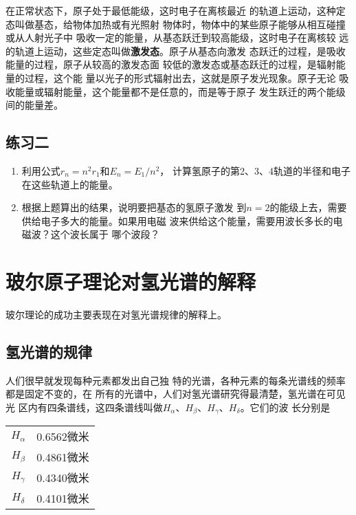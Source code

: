 在正常状态下，原子处于最低能级，这时电子在离核最近
的轨道上运动，这种定态叫做基态，给物体加热或有光照射
物体时，物体中的某些原子能够从相互碰撞或从人射光子中
吸收一定的能量，从基态跃迁到较高能级，这时电子在离核较
远的轨道上运动，这些定态叫做\textbf{激发态}。原子从基态向激发
态跃迁的过程，是吸收能量的过程，原子从较高的激发态面
较低的激发态或基态跃迁的过程，是辐射能量的过程，这个能
量以光子的形式辐射出去，这就是原子发光现象。原子无论
吸收能量或辐射能量，这个能量都不是任意的，而是等于原子
发生跃迁的两个能级间的能量差。


\subsection*{练习二}

\begin{enumerate}
    \item 利用公式$r_n=n^2r_1$和$E_n=E_1/n^2$，
计算氢原子的第2、3、4轨道的半径和电子在这些轨道上的能量。
\item 根据上题算出的结果，说明要把基态的氢原子激发
到$n=2$的能级上去，需要供给电子多大的能量。如果用电磁
波来供给这个能量，需要用波长多长的电磁波？这个波长属于
哪个波段？
\end{enumerate}

\section{玻尔原子理论对氢光谱的解释}

玻尔理论的成功主要表现在对氢光谱规律的解释上。

\subsection{氢光谱的规律}

人们很早就发现每种元素都发出自己独
特的光谱，各种元素的每条光谱线的频率都是固定不变的，在
所有的光谱中，人们对氢光谱研究得最清楚，氢光谱在可见光
区内有四条谱线，这四条谱线叫做$H_{\alpha}$、$H_{\beta}$、$H_{\gamma}$、$H_{\delta}$。它们的波
长分别是
\begin{center}
    \begin{tabular}{cc}
        $H_{\alpha}$  &0.6562微米\\
        $H_{\beta}$  &0.4861微米\\
        $H_{\gamma}$  &0.4340微米\\
        $H_{\delta}$  &0.4101微米\\
    \end{tabular}
\end{center}

